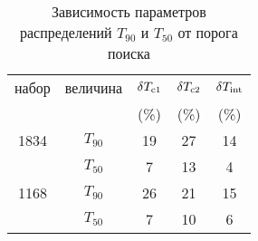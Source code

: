\begin{table} [h]
 \centering
 \caption{Зависимость параметров распределений $T_{90}$ и $T_{50}$ от порога поиска}
 \label{tab:Txx_vs_thd}
\scriptsize
  \begin{center}
  \begin{tabular}{c c c c c}
  \hline
  \hline
набор & величина & $\delta T_{\mathrm{c1}}$ & $\delta T_{\mathrm{c2}}$ & $\delta T_{\mathrm{int}}$ \\
      &          &         (\%)        &   (\%)              &  (\%)            \\       
    
\hline
1834  &  $T_{90}$ &  19  & 27 &  14 \\ 
      &  $T_{50}$ &  7   & 13 &  4  \\ 
1168  &  $T_{90}$ &  26  & 21 &  15 \\ 
      &  $T_{50}$ &  7   & 10 &  6  \\
\hline
\end{tabular}
\end{center}
\end{table}